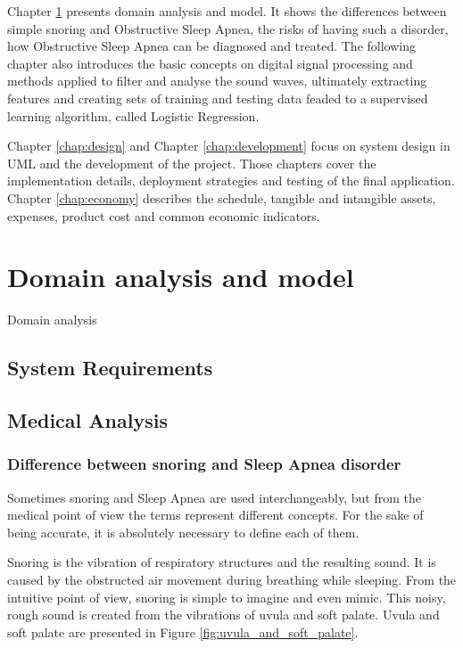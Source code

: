 \documentclass[12pt,a4paper]{report}
\begin{document}
Chapter \ref{chap:domain} presents domain analysis and model. It shows the differences between simple snoring and Obstructive Sleep Apnea, the risks of having such a disorder, how Obstructive Sleep Apnea can be diagnosed and treated. The following chapter also introduces the basic concepts on digital signal processing and methods applied to filter and analyse the sound waves, ultimately extracting features and creating sets of training and testing data feaded to a supervised learning algorithm, called Logistic Regression.

Chapter \ref{chap:design} and Chapter \ref{chap:development} focus on system design in UML and the development of the project. Those chapters cover the implementation details, deployment strategies and testing of the final application. Chapter \ref{chap:economy} describes the schedule, tangible and intangible assets, expenses, product cost and common economic indicators.

\chapter{Domain analysis and model}\label{chap:domain}
Domain analysis
\section{System Requirements}
\section{Medical Analysis}
\subsection{Difference between snoring and Sleep Apnea disorder}
Sometimes snoring and Sleep Apnea are used interchangeably, but from the medical point of view the terms represent different concepts. For the sake of being accurate, it is absolutely necessary to define each of them.

Snoring is the vibration of respiratory structures and the resulting sound. It is caused by the obstructed air movement during breathing while sleeping. From the intuitive point of view, snoring is simple to imagine and even mimic. This noisy, rough sound is created from the vibrations of uvula and soft palate. Uvula and soft palate are presented in Figure \ref{fig:uvula_and_soft_palate}.
\end{document}
